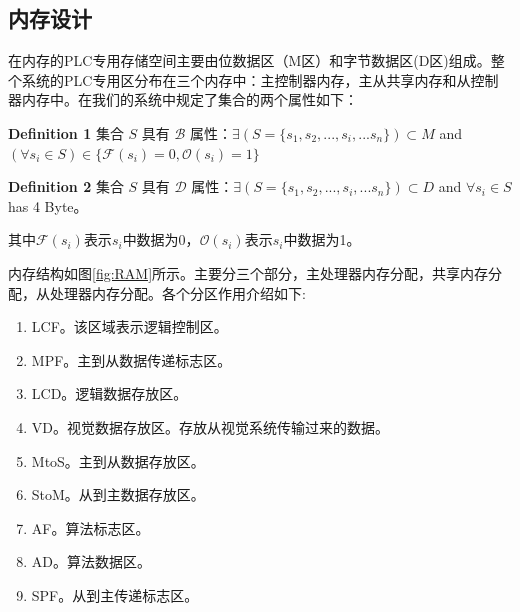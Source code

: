\documentclass[journal,UTF8]{IEEEtran}
\begin{document}
\subsection{内存设计}
在内存的PLC专用存储空间主要由位数据区（M区）和字节数据区(D区)组成。整个系统的PLC专用区分布在三个内存中：主控制器内存，主从共享内存和从控制器内存中。在我们的系统中规定了集合的两个属性如下：

\textbf{Definition 1} 集合 $S$ 具有 $\mathcal{B}$ 属性：$\exists (S=\{s_1,s_2,...,s_i,...s_n\}) \subset M$ and $(\forall s_{i} \in S) \in \{\mathcal{F}(s_i) = 0,\mathcal{O}(s_i) = 1\} $

\textbf{Definition 2} 集合 $S$ 具有 $\mathcal{D}$ 属性：$\exists (S=\{s_1,s_2,...,s_i,...s_n\}) \subset D$ and $\forall s_{i} \in S$ has 4 Byte。

其中$\mathcal{F}(s_i)$表示$s_i$中数据为0，$\mathcal{O}(s_i)$表示$s_i$中数据为1。

内存结构如图\ref{fig:RAM}所示。主要分三个部分，主处理器内存分配，共享内存分配，从处理器内存分配。各个分区作用介绍如下:
\begin{enumerate}
	\item LCF。该区域表示逻辑控制区。
	\item MPF。主到从数据传递标志区。
	\item LCD。逻辑数据存放区。
	\item VD。视觉数据存放区。存放从视觉系统传输过来的数据。
	\item MtoS。主到从数据存放区。
	\item StoM。从到主数据存放区。
	\item AF。算法标志区。
	\item AD。算法数据区。
	\item SPF。从到主传递标志区。
\end{enumerate}
\end{document}
